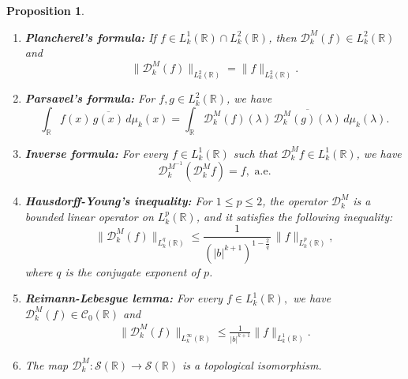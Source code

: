 \documentclass[12pt,a4paper,reqno]{amsproc}
\newtheorem{proposition}[theorem]{Proposition}
\theoremstyle{definition}
\theoremstyle{remark}
\numberwithin{equation}{section}
\begin{document}
\begin{proposition}
\begin{enumerate} [$(i)$]
\item
\textbf{Plancherel's formula:} If $f \in  L^{1}_{k}(\mathbb{R})\cap L^{2}_{k}(\mathbb{R}) $, then  $\mathcal{D}^M_k(f) \in L^{2}_{k}(\mathbb{R})$ and  
 \begin{equation*}
 \|\mathcal{D}^M_k(f)\|_{ L^{2}_{k}(\mathbb{R})} = \| f \|_{ L^{2}_{k}(\mathbb{R})}.
 \end{equation*}
 \vspace{.2cm}
\item \textbf{Parsavel's formula:} For $f,g \in L_k^2(\mathbb{R})$, we have
\begin{equation*}
\int_{\mathbb{R}}f(x)\,\overline{g(x)}\,d\mu_k(x) = \int_{\mathbb{R}} \mathcal{D}_k^M(f)(\lambda)\,\overline{\mathcal{D}_k^M(g)(\lambda)}\,d\mu_k(\lambda).   
\end{equation*}
\vspace{.2cm}
\item \textbf{Inverse formula:}  For every $ f\in L^1_{k}(\mathbb{R})$ such that $\mathcal{D}^M_{k}f \in L^1_{k}(\mathbb{R})$, we have
\begin{equation*} 
\mathcal{D}^{M^{-1}}_{k} (\mathcal{D}^M_{k}f)
=f ,\,\, \text{a.e}.    
\end{equation*}
\vspace{.2cm}
 \item\textbf{Hausdorff-Young's inequality:} For $ 1 \le p \le 2$, the operator $\mathcal{D}_k^M$ is a bounded linear operator on $L_k^p(\mathbb{R})$, and it satisfies the following inequality:   \begin{equation*}
    \|\mathcal{D}_k^M(f)\|_{L_k^{q}(\mathbb{R})} \le \frac{1}{\left(|b|^{k+1}\right)^{1-\frac{2}{q}}}\, \|f\|_{L^p_k(\mathbb{R})},
\end{equation*}
where $q$ is the conjugate exponent of $p$.\\
\vspace{.2cm}
\item \textbf{Reimann-Lebesgue lemma:}
    For every $f\in L_k^1(\mathbb{R}),$ we have $\mathcal{D}_k^M(f)\in \mathcal{C}_0(\mathbb{R})$ and
    \begin{align*}
    \|\mathcal{D}_k^M(f)\|_{L_k^{\infty}(\mathbb{R})} \leq \frac{1}{|b|^{k+1}} \|f\|_{L_k^1(\mathbb{R})}.
    \end{align*}
\item The map $\mathcal{D}_k^M:\mathcal{S}(\mathbb{R}) \rightarrow \mathcal{S}(\mathbb{R})$ is a topological isomorphism.
\end{enumerate}
\end{proposition}
\end{document}
